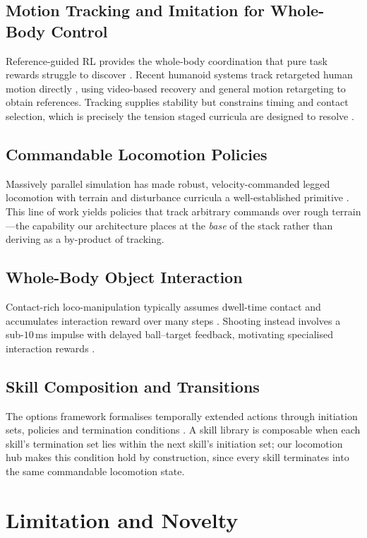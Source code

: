 \documentclass{article}
\begin{document}
\subsection{Motion Tracking and Imitation for Whole-Body Control}
Reference-guided RL provides the whole-body coordination that pure task rewards struggle to discover \citep{deepmimic,amp}. Recent humanoid systems track retargeted human motion directly \citep{beyondmimic}, using video-based recovery \citep{gvhmr} and general motion retargeting \citep{gmr} to obtain references. Tracking supplies stability but constrains timing and contact selection, which is precisely the tension staged curricula are designed to resolve \citep{robonaldo}.

\subsection{Commandable Locomotion Policies}
Massively parallel simulation has made robust, velocity-commanded legged locomotion with terrain and disturbance curricula a well-established primitive \citep{rudin2022,isaaclab}. This line of work yields policies that track arbitrary commands over rough terrain---the capability our architecture places at the \emph{base} of the stack rather than deriving as a by-product of tracking.

\subsection{Whole-Body Object Interaction}
Contact-rich loco-manipulation typically assumes dwell-time contact and accumulates interaction reward over many steps \citep{hdmi,resmimic,intermimic,falcon}. Shooting instead involves a sub-$10$\,ms impulse with delayed ball--target feedback, motivating specialised interaction rewards \citep{robonaldo}.

\subsection{Skill Composition and Transitions}
The options framework formalises temporally extended actions through initiation sets, policies and termination conditions \citep{options}. A skill library is composable when each skill's termination set lies within the next skill's initiation set; our locomotion hub makes this condition hold by construction, since every skill terminates into the same commandable locomotion state.

\section{Limitation and Novelty}
\end{document}
